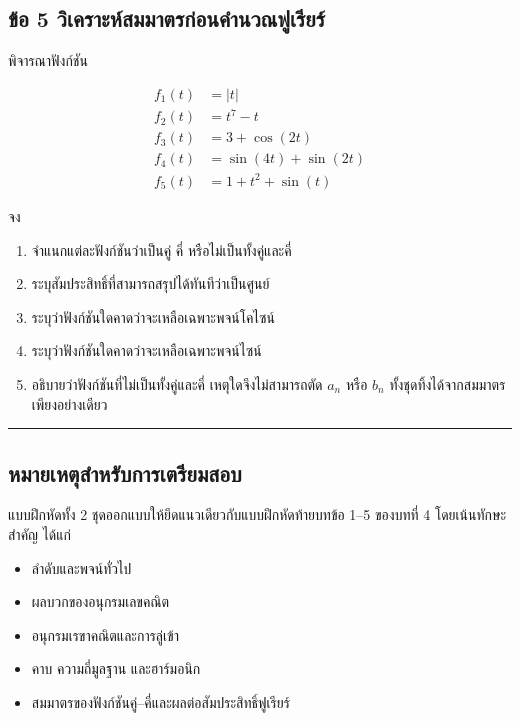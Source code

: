 \subsection{ข้อ 5 วิเคราะห์สมมาตรก่อนคำนวณฟูเรียร์}

พิจารณาฟังก์ชัน

\[
\begin{aligned}
f_1(t)&=|t|\\
f_2(t)&=t^7-t\\
f_3(t)&=3+\cos(2t)\\
f_4(t)&=\sin(4t)+\sin(2t)\\
f_5(t)&=1+t^2+\sin(t)
\end{aligned}
\]

จง

\begin{enumerate}
    \item จำแนกแต่ละฟังก์ชันว่าเป็นคู่ คี่ หรือไม่เป็นทั้งคู่และคี่
    \item ระบุสัมประสิทธิ์ที่สามารถสรุปได้ทันทีว่าเป็นศูนย์
    \item ระบุว่าฟังก์ชันใดคาดว่าจะเหลือเฉพาะพจน์โคไซน์
    \item ระบุว่าฟังก์ชันใดคาดว่าจะเหลือเฉพาะพจน์ไซน์
    \item อธิบายว่าฟังก์ชันที่ไม่เป็นทั้งคู่และคี่ เหตุใดจึงไม่สามารถตัด \(a_n\) หรือ \(b_n\) ทั้งชุดทิ้งได้จากสมมาตรเพียงอย่างเดียว
\end{enumerate}

\par\noindent\rule{\textwidth}{0.4pt}\par

\subsection{หมายเหตุสำหรับการเตรียมสอบ}

แบบฝึกหัดทั้ง 2 ชุดออกแบบให้ยึดแนวเดียวกับแบบฝึกหัดท้ายบทข้อ 1–5 ของบทที่ 4 โดยเน้นทักษะสำคัญ ได้แก่

\begin{itemize}
    \item ลำดับและพจน์ทั่วไป
    \item ผลบวกของอนุกรมเลขคณิต
    \item อนุกรมเรขาคณิตและการลู่เข้า
    \item คาบ ความถี่มูลฐาน และฮาร์มอนิก
    \item สมมาตรของฟังก์ชันคู่–คี่และผลต่อสัมประสิทธิ์ฟูเรียร์
\end{itemize}

